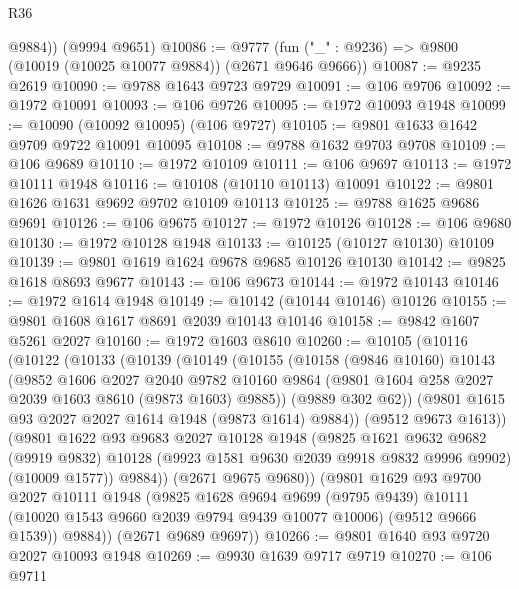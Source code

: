 \begin{lexlean}{R36}
\begin{coremodule}
        @9884))
    (@9994 @9651)
@10086 := @9777 (fun ("_" : @9236) => @9800 (@10019 (@10025 @10077 @9884)) (@2671 @9646 @9666))
@10087 := @9235 @2619
@10090 := @9788 @1643 @9723 @9729
@10091 := @106 @9706
@10092 := @1972 @10091
@10093 := @106 @9726
@10095 := @1972 @10093 @1948
@10099 := @10090 (@10092 @10095) (@106 @9727)
@10105 := @9801 @1633 @1642 @9709 @9722 @10091 @10095
@10108 := @9788 @1632 @9703 @9708
@10109 := @106 @9689
@10110 := @1972 @10109
@10111 := @106 @9697
@10113 := @1972 @10111 @1948
@10116 := @10108 (@10110 @10113) @10091
@10122 := @9801 @1626 @1631 @9692 @9702 @10109 @10113
@10125 := @9788 @1625 @9686 @9691
@10126 := @106 @9675
@10127 := @1972 @10126
@10128 := @106 @9680
@10130 := @1972 @10128 @1948
@10133 := @10125 (@10127 @10130) @10109
@10139 := @9801 @1619 @1624 @9678 @9685 @10126 @10130
@10142 := @9825 @1618 @8693 @9677
@10143 := @106 @9673
@10144 := @1972 @10143
@10146 := @1972 @1614 @1948
@10149 := @10142 (@10144 @10146) @10126
@10155 := @9801 @1608 @1617 @8691 @2039 @10143 @10146
@10158 := @9842 @1607 @5261 @2027
@10160 := @1972 @1603 @8610
@10260 := @10105
    (@10116
      (@10122
        (@10133
          (@10139
            (@10149
              (@10155
                (@10158
                  (@9846 @10160)
                  @10143
                  (@9852
                    @1606
                    @2027
                    @2040
                    @9782
                    @10160
                    @9864
                    (@9801 @1604 @258 @2027 @2039 @1603 @8610 (@9873 @1603) @9885))
                  (@9889 @302 @62))
                (@9801 @1615 @93 @2027 @2027 @1614 @1948 (@9873 @1614) @9884))
              (@9512 @9673 @1613))
            (@9801
              @1622
              @93
              @9683
              @2027
              @10128
              @1948
              (@9825
                @1621
                @9632
                @9682
                (@9919 @9832)
                @10128
                (@9923 @1581 @9630 @2039 @9918 @9832 @9996 @9902)
                (@10009 @1577))
              @9884))
          (@2671 @9675 @9680))
        (@9801
          @1629
          @93
          @9700
          @2027
          @10111
          @1948
          (@9825
            @1628
            @9694
            @9699
            (@9795 @9439)
            @10111
            (@10020 @1543 @9660 @2039 @9794 @9439 @10077 @10006)
            (@9512 @9666 @1539))
          @9884))
      (@2671 @9689 @9697))
@10266 := @9801 @1640 @93 @9720 @2027 @10093 @1948
@10269 := @9930 @1639 @9717 @9719
@10270 := @106 @9711

\end{coremodule}
\end{lexlean}
